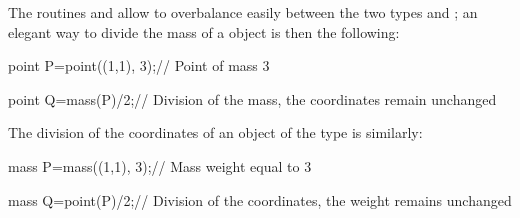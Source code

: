 \documentclass[pdftex]{article}
\begin{document}
The routines  and
allow to overbalance easily between the two types   and
; an elegant way to divide the mass of a 
object is then the following:

\begin{Vcolor}
  point P=point((1,1), 3);// Point of mass 3

  point Q=mass(P)/2;// Division of the mass, the coordinates remain unchanged

\end{Vcolor}

The division of the coordinates of an object  of the type 
is similarly:

\begin{Vcolor}
  mass P=mass((1,1), 3);// Mass weight equal to 3

  mass Q=point(P)/2;// Division of the coordinates, the weight remains unchanged

\end{Vcolor}
\end{document}

